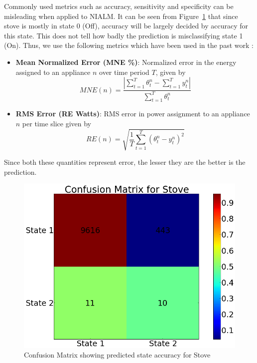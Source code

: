 \documentclass[conference]{IEEEtran}
\newcommand{\figref}[1]{Figure~\ref{#1}}
\begin{document}
Commonly used metrics such as accuracy, sensitivity and specificity can be misleading when applied to NIALM. It can be seen from \figref{fig:confusion} that since stove is mostly in state 0 (Off), accuracy will be largely decided by accuracy for this state. This does not tell how badly the prediction is misclassifying state 1 (On). 
Thus, we use the following metrics which have been used in the past work \cite{parson2012_aaai,redd}:
\begin{itemize}
\item \textbf{Mean Normalized Error (MNE \%)}: Normalized error in the energy assigned to an appliance $n$ over time period $T$, given by 
$$ MNE(n)=\frac{|\sum\limits_{t=1}^{T}\theta_t^n- \sum\limits_{t=1}^{T}y_t^n|}{\sum\limits_{t=1}^{T}\theta_t^n} $$


\item \textbf{RMS Error (RE Watts)}: RMS error in power assignment to an appliance $n$ per time slice given by
$$RE(n)=\sqrt{\frac{1}{T}\sum\limits_{t=1}^{T}(\theta_t^n-y_t^n)^2}$$

\end{itemize} 
Since both these quantities represent error, the lesser they are the better is the prediction.
\begin{figure}
\centering \includegraphics[scale=0.2]{./figures/confusion_stove.png}
\caption{Confusion Matrix showing predicted state accuracy for Stove}
   \label{fig:confusion}
\end{figure}
\end{document}
